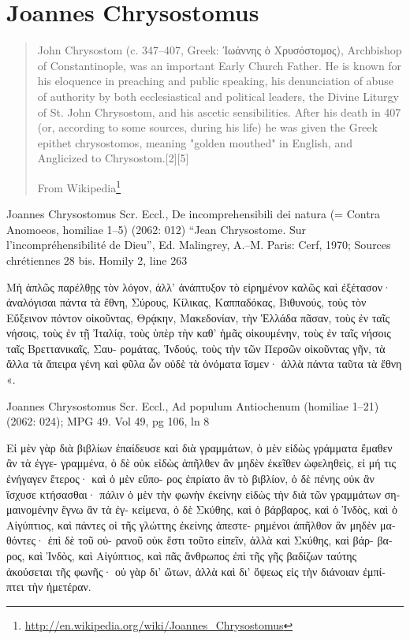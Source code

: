 \documentclass[12pt,letterpaper,twoside,final]{memoir}
\begin{document}
\section{Joannes Chrysostomus}
\blockquote[From Wikipedia\footnote{\url{http://en.wikipedia.org/wiki/Joannes_Chrysostomus}}]{John Chrysostom (c. 347–407, Greek: Ἰωάννης ὁ Χρυσόστομος), Archbishop of Constantinople, was an important Early Church Father. He is known for his eloquence in preaching and public speaking, his denunciation of abuse of authority by both ecclesiastical and political leaders, the Divine Liturgy of St. John Chrysostom, and his ascetic sensibilities. After his death in 407 (or, according to some sources, during his life) he was given the Greek epithet chrysostomos, meaning "golden mouthed" in English, and Anglicized to Chrysostom.[2][5]}
\begin{greek}

Joannes Chrysostomus Scr. Eccl., De incomprehensibili dei natura (= Contra Anomoeos, homiliae 1–5) (2062: 012)
“Jean Chrysostome. Sur l'incompréhensibilité de Dieu”, Ed. Malingrey, A.–M.
Paris: Cerf, 1970; Sources chrétiennes 28 bis.
Homily 2, line 263

                                               Μὴ ἁπλῶς 
παρέλθῃς τὸν λόγον, ἀλλ' ἀνάπτυξον τὸ εἰρημένον καλῶς   
καὶ ἐξέτασον· ἀναλόγισαι πάντα τὰ ἔθνη, Σύρους, Κίλικας, 
Καππαδόκας, Βιθυνούς, τοὺς τὸν Εὔξεινον πόντον οἰκοῦντας, 
Θρᾴκην, Μακεδονίαν, τὴν Ἑλλάδα πᾶσαν, τοὺς ἐν ταῖς 
νήσοις, τοὺς ἐν τῇ Ἰταλίᾳ, τοὺς ὑπὲρ τὴν καθ' ἡμᾶς 
οἰκουμένην, τοὺς ἐν ταῖς νήσοις ταῖς Βρεττανικαῖς, Σαυ-
ρομάτας, Ἰνδούς, τοὺς τὴν τῶν Περσῶν οἰκοῦντας γῆν, 
τὰ ἄλλα τὰ ἄπειρα γένη καὶ φῦλα ὧν οὐδὲ τὰ ὀνόματα 
ἴσμεν· ἀλλὰ πάντα ταῦτα τὰ ἔθνη «. 

Joannes Chrysostomus Scr. Eccl., Ad populum Antiochenum (homiliae 1–21) (2062: 024); MPG 49.
Vol 49, pg 106, ln 8

            Εἰ μὲν γὰρ διὰ βιβλίων ἐπαίδευσε καὶ διὰ 
γραμμάτων, ὁ μὲν εἰδὼς γράμματα ἔμαθεν ἂν τὰ ἐγγε-
γραμμένα, ὁ δὲ οὐκ εἰδὼς ἀπῆλθεν ἂν μηδὲν ἐκεῖθεν 
ὠφεληθεὶς, εἰ μή τις ἐνήγαγεν ἕτερος· καὶ ὁ μὲν εὔπο-
ρος ἐπρίατο ἂν τὸ βιβλίον, ὁ δὲ πένης οὐκ ἂν ἴσχυσε 
κτήσασθαι· πάλιν ὁ μὲν τὴν φωνὴν ἐκείνην εἰδὼς τὴν 
διὰ τῶν γραμμάτων σημαινομένην ἔγνω ἂν τὰ ἐγ-
κείμενα, ὁ δὲ Σκύθης, καὶ ὁ βάρβαρος, καὶ ὁ Ἰνδὸς, καὶ 
ὁ Αἰγύπτιος, καὶ πάντες οἱ τῆς γλώττης ἐκείνης ἀπεστε-
ρημένοι ἀπῆλθον ἂν μηδὲν μαθόντες· ἐπὶ δὲ τοῦ οὐ-
ρανοῦ οὐκ ἔστι τοῦτο εἰπεῖν, ἀλλὰ καὶ Σκύθης, καὶ βάρ-
βαρος, καὶ Ἰνδὸς, καὶ Αἰγύπτιος, καὶ πᾶς ἄνθρωπος 
ἐπὶ τῆς γῆς βαδίζων ταύτης ἀκούσεται τῆς φωνῆς· οὐ 
γὰρ δι' ὤτων, ἀλλὰ καὶ δι' ὄψεως εἰς τὴν διάνοιαν ἐμπί-
πτει τὴν ἡμετέραν. 




\end{greek}
\end{document}

